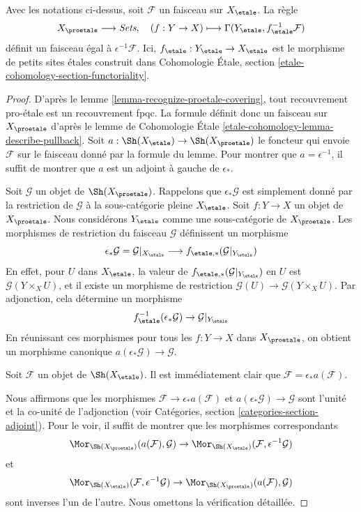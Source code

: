 \begin{lemma}
\label{lemma-describe-pullback-from-etale}
Avec les notations ci-dessus, soit $\mathcal{F}$ un faisceau sur $X_\etale$.
La règle
$$
X_\proetale \longrightarrow \textit{Sets},\quad
(f : Y \to X) \longmapsto \Gamma(Y_\etale, f_\etale^{-1}\mathcal{F})
$$
définit un faisceau égal à $\epsilon^{-1}\mathcal{F}$.
Ici, $f_\etale : Y_\etale \to X_\etale$ est le morphisme de
petits sites \'etales construit dans
Cohomologie \'Etale, section \ref{etale-cohomology-section-functoriality}.
\end{lemma}

\begin{proof}
D'après le lemme \ref{lemma-recognize-proetale-covering}, tout recouvrement pro-\'etale
est un recouvrement fpqc. La formule définit donc un faisceau sur $X_\proetale$
d'après le lemme de Cohomologie \'Etale \ref{etale-cohomology-lemma-describe-pullback}.
Soit $a : \Sh(X_\etale) \to \Sh(X_\proetale)$ le foncteur
qui envoie $\mathcal{F}$ sur le faisceau donné par la formule du lemme.
Pour montrer que $a = \epsilon^{-1}$, il suffit de montrer que $a$ est un
adjoint à gauche de $\epsilon_*$.

\medskip\noindent
Soit $\mathcal{G}$ un objet de $\Sh(X_\proetale)$.
Rappelons que $\epsilon_*\mathcal{G}$ est simplement donné par la restriction de
$\mathcal{G}$ à la sous-catégorie pleine $X_\etale$.
Soit $f : Y \to X$ un objet de $X_\proetale$.
Nous considérons $Y_\etale$ comme une sous-catégorie de $X_\proetale$.
Les morphismes de restriction du faisceau $\mathcal{G}$ définissent un morphisme
$$
\epsilon_*\mathcal{G} = \mathcal{G}|_{X_\etale}
\longrightarrow
f_{\etale, *}(\mathcal{G}|_{Y_\etale})
$$
En effet, pour $U$ dans $X_\etale$, la valeur de
$f_{\etale, *}(\mathcal{G}|_{Y_\etale})$ en $U$
est $\mathcal{G}(Y \times_X U)$, et il existe un morphisme de restriction
$\mathcal{G}(U) \to \mathcal{G}(Y \times_X U)$.
Par adjonction, cela détermine un morphisme
$$
f_\etale^{-1}(\epsilon_*\mathcal{G}) \to \mathcal{G}|_{Y_\etale}
$$
En réunissant ces morphismes pour tous les $f : Y \to X$ dans $X_\proetale$,
on obtient un morphisme canonique $a(\epsilon_*\mathcal{G}) \to \mathcal{G}$.

\medskip\noindent
Soit $\mathcal{F}$ un objet de $\Sh(X_\etale)$. Il est immédiatement
clair que $\mathcal{F} = \epsilon_*a(\mathcal{F})$.

\medskip\noindent 
Nous affirmons que les morphismes $\mathcal{F} \to \epsilon_*a(\mathcal{F})$ et
$a(\epsilon_*\mathcal{G}) \to \mathcal{G}$
sont l'unité et la co-unité de l'adjonction (voir
Catégories, section \ref{categories-section-adjoint}).
Pour le voir, il suffit de montrer que les morphismes correspondants
$$
\Mor_{\Sh(X_\proetale)}(a(\mathcal{F}), \mathcal{G}) \to
\Mor_{\Sh(X_\etale)}(\mathcal{F}, \epsilon^{-1}\mathcal{G})
$$
et
$$
\Mor_{\Sh(X_\etale)}(\mathcal{F}, \epsilon^{-1}\mathcal{G}) \to
\Mor_{\Sh(X_\proetale)}(a(\mathcal{F}), \mathcal{G})
$$
sont inverses l'un de l'autre. Nous omettons la vérification détaillée.
\end{proof}

